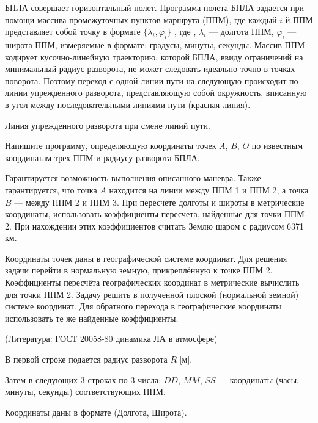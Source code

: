 
БПЛА совершает горизонтальный полет. Программа полета БПЛА задается при
помощи массива промежуточных пунктов маршрута (ППМ), где каждый  $i$-й ППМ
представляет собой точку в формате $\{\lambda_i, \varphi_i\}$ , где , $\lambda_i$  — долгота ППМ, 
$\varphi_i$   — широта ППМ, измеряемые в формате: градусы, минуты, секунды.
Массив ППМ кодирует кусочно-линейную траекторию, которой БПЛА, ввиду
ограничений на минимальный радиус разворота, не может следовать идеально точно
в точках поворота. Поэтому переход с одной линии пути на следующую происходит
по линии упрежденного разворота, представляющую собой окружность, вписанную в
угол между последовательными линиями пути (красная линия).


\begin{center}
Линия упрежденного
разворота при смене линий пути.
\end{center}

Напишите программу, определяющую координаты точек  $A$, $B$, $O$  по известным координатам трех ППМ и
радиусу разворота БПЛА.

Гарантируется возможность выполнения описанного
маневра. Также гарантируется, что точка  $A$  находится на линии между ППМ 1 и ППМ
2, а точка $B$  — между ППМ 2 и ППМ 3. При пересчете долготы и широты в
метрические координаты, использовать коэффициенты пересчета, найденные для точки
ППМ 2. При нахождении этих коэффициентов считать Землю шаром с радиусом 6371 
км.

Координаты точек даны в географической системе координат. Для решения 
задачи перейти в нормальную земную, прикреплённую к точке ППМ 2. 
Коэффициенты пересчёта географических координат в метрические вычислить для точки ППМ 2. 
Задачу решить в полученной плоской (нормальной земной) системе координат. Для обратного 
перехода в географические координаты использовать те же найденные коэффициенты.

(Литература: ГОСТ 20058-80 динамика ЛА в атмосфере)


В первой строке подается радиус разворота $R$  [м].

Затем в следующих 3 строках по 3 числа:  $DD$, $MM$, $SS$  — координаты (часы, минуты, секунды) 
соответствующих ППМ.

Координаты даны в формате (Долгота, Широта).

